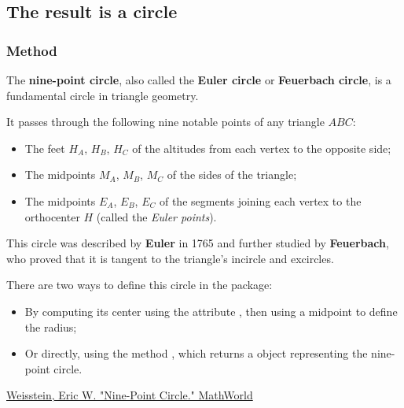 
\subsection{The result is a circle}
\subsubsection{Method } %
\label{ssub:method_triangle_euler_circle}

The \textbf{nine-point circle}, also called the \textbf{Euler circle} or \textbf{Feuerbach circle}, is a fundamental circle in triangle geometry.

\medskip
\noindent
It passes through the following nine notable points of any triangle $ABC$:
\begin{itemize}
  \item The feet $H_A$, $H_B$, $H_C$ of the altitudes from each vertex to the opposite side;
  \item The midpoints $M_A$, $M_B$, $M_C$ of the sides of the triangle;
  \item The midpoints $E_A$, $E_B$, $E_C$ of the segments joining each vertex to the orthocenter $H$ (called the \emph{Euler points}).
\end{itemize}

\noindent
This circle was described by \textbf{Euler} in 1765 and further studied by \textbf{Feuerbach}, who proved that it is tangent to the triangle’s incircle and excircles.

\medskip
\noindent
There are two ways to define this circle in the package:
\begin{itemize}
  \item By computing its center using the attribute , then using a midpoint to define the radius;
  \item Or directly, using the method , which returns a  object representing the nine-point circle.
\end{itemize}
\begin{flushright}
\small
\href{https://mathworld.wolfram.com/Nine-PointCircle.html}{Weisstein, Eric W. "Nine-Point Circle." MathWorld}
\end{flushright}

\vspace{1em}
\begin{tkzexample}[latex=.5\textwidth]
\begin{center}
\end{center}
\end{tkzexample}

